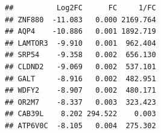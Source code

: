 \documentclass[]{article}
\newenvironment{Shaded}{\begin{snugshade}}{\end{snugshade}}
\newcommand{\KeywordTok}[1]{\textcolor[rgb]{0.13,0.29,0.53}{\textbf{{#1}}}}
\newcommand{\DataTypeTok}[1]{\textcolor[rgb]{0.13,0.29,0.53}{{#1}}}
\newcommand{\DecValTok}[1]{\textcolor[rgb]{0.00,0.00,0.81}{{#1}}}
\newcommand{\StringTok}[1]{\textcolor[rgb]{0.31,0.60,0.02}{{#1}}}
\newcommand{\OtherTok}[1]{\textcolor[rgb]{0.56,0.35,0.01}{{#1}}}
\newcommand{\NormalTok}[1]{{#1}}
\begin{document}
\begin{Shaded}
\end{Shaded}

\begin{verbatim}
##          Log2FC      FC     1/FC
## ZNF880  -11.083   0.000 2169.764
## AQP4    -10.886   0.001 1892.719
## LAMTOR3  -9.910   0.001  962.404
## SRP54    -9.358   0.002  656.130
## CLDND2   -9.069   0.002  537.101
## GALT     -8.916   0.002  482.951
## WDFY2    -8.907   0.002  480.171
## OR2M7    -8.337   0.003  323.423
## CAB39L    8.202 294.522    0.003
## ATP6V0C  -8.105   0.004  275.302
\end{verbatim}
\end{document}
